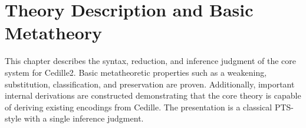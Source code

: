 \chapter{Theory Description and Basic Metatheory}


This chapter describes the syntax, reduction, and inference judgment of the core system for Cedille2.
Basic metatheoretic properties such as a weakening, substitution, classification, and preservation are proven.
Additionally, important internal derivations are constructed demonstrating that the core theory is capable of deriving existing encodings from Cedille.
The presentation is a classical PTS-style with a single inference judgment.








